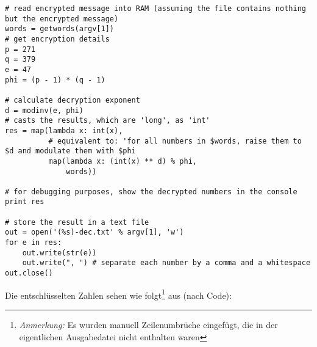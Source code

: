 \documentclass{article}
\begin{document}
\begin{lstlisting}[caption=\string$ python rsa.py msg.txt]
# read encrypted message into RAM (assuming the file contains nothing but the encrypted message)
words = getwords(argv[1])
# get encryption details
p = 271
q = 379
e = 47
phi = (p - 1) * (q - 1)

# calculate decryption exponent
d = modinv(e, phi)
# casts the results, which are 'long', as 'int'
res = map(lambda x: int(x),
          # equivalent to: 'for all numbers in $words, raise them to $d and modulate them with $phi
          map(lambda x: (int(x) ** d) % phi,
              words))

# for debugging purposes, show the decrypted numbers in the console
print res

# store the result in a text file
out = open('(%s)-dec.txt' % argv[1], 'w')
for e in res:
    out.write(str(e))
    out.write(", ") # separate each number by a comma and a whitespace
out.close()

\end{lstlisting}
Die entschlüsselten Zahlen sehen wie folgt\footnote{\textit{Anmerkung:} Es wurden manuell Zeilenumbrüche eingefügt, die in der eigentlichen Ausgabedatei nicht enthalten waren} aus (nach Code):
\end{document}
